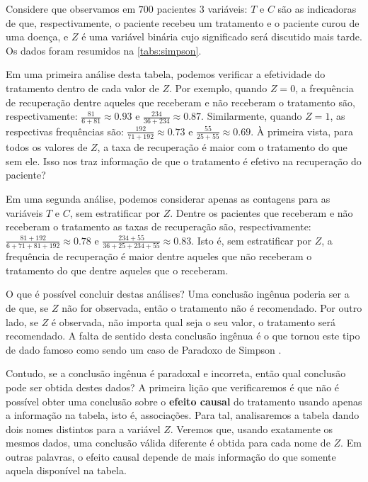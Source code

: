 Considere que observamos em $700$ pacientes $3$ variáveis: 
$T$ e $C$ são as indicadoras de que, respectivamente,
o paciente recebeu um tratamento e o paciente curou de uma doença, e
$Z$ é uma variável binária cujo significado será discutido mais tarde.
Os dados foram resumidos na \cref{tabs:simpson}.

Em uma primeira análise desta tabela, podemos 
verificar a efetividade do tratamento 
dentro de cada valor de $Z$.
Por exemplo, quando $Z=0$,
a frequência de recuperação dentre aqueles que 
receberam e não receberam o tratamento 
são, respectivamente: $\frac{81}{6+81} \approx 0.93$ e
$\frac{234}{36+234} \approx 0.87$.
Similarmente, quando $Z=1$,
as respectivas frequências são:
$\frac{192}{71+192} \approx 0.73$ e
$\frac{55}{25+55} \approx 0.69$.
À primeira vista, para todos os valores de $Z$, a taxa de recuperação 
é maior com o tratamento do que sem ele.
Isso nos traz informação de que 
o tratamento é efetivo na recuperação do paciente?

Em uma segunda análise, podemos considerar
apenas as contagens para as variáveis $T$ e $C$,
sem estratificar por $Z$.
Dentre os pacientes que receberam e não receberam o tratamento
as taxas de recuperação são, respectivamente:
$\frac{81+192}{6+71+81+192} \approx 0.78$ e
$\frac{234+55}{36+25+234+55} \approx 0.83$. Isto é,
sem estratificar por $Z$, a frequência de recuperação é
maior dentre aqueles que não receberam o tratamento
do que dentre aqueles que o receberam.

O que é possível concluir destas análises?
Uma conclusão ingênua poderia ser a de que,
se $Z$ não for observada, então o tratamento não é recomendado.
Por outro lado, se $Z$ é observada, 
não importa qual seja o seu valor, o tratamento será recomendado.
A falta de sentido desta conclusão ingênua é
o que tornou este tipo de dado famoso como sendo
um caso de Paradoxo de Simpson \citep{Simpson1951}.

Contudo, se a conclusão ingênua é paradoxal e incorreta,
então qual conclusão pode ser obtida destes dados?
A primeira lição que verificaremos é que não é possível obter
uma conclusão sobre o \textbf{efeito causal} do tratamento usando
apenas a informação na tabela, isto é, associações.
Para tal, analisaremos a tabela dando 
dois nomes distintos para a variável $Z$.
Veremos que, usando exatamente os mesmos dados,
uma conclusão válida diferente é obtida para cada nome de $Z$.
Em outras palavras, o efeito causal depende de
mais informação do que somente aquela disponível na tabela.

